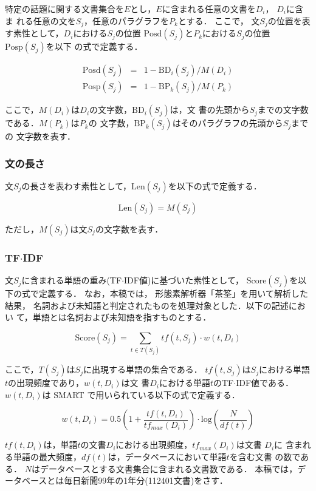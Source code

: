 特定の話題に関する文書集合を$E$とし，$E$に含まれる任意の文書を$D_i$，
$D_i$に含ま
れる任意の文を$S_j$，任意のパラグラフを$P_k$とする．
ここで，
文$S_j$の位置を表す素性として，$D_i$における$S_j$の位置
$\mbox{Posd}(S_j)$と$P_{k}$における$S_j$の位置$\mbox{Posp}(S_j)$を以下
の式で定義する．

\begin{eqnarray}
 \mbox{Posd}(S_j) &=& 1 - \mbox{BD}_i(S_j)/M(D_i) \nonumber\\
 \mbox{Posp}(S_{j}) &=& 1 - \mbox{BP}_{k}(S_j)/M(P_{k}) \nonumber
\end{eqnarray}

ここで，$M(D_i)$は$D_i$の文字数，$\mbox{BD}_i(S_j)$は，文
書の先頭から$S_j$までの文字数である．$M(P_{k})$は$P_{k}$の
文字数，$\mbox{BP}_{k}(S_j)$はそのパラグラフの先頭から$S_j$までの
文字数を表す．

\subsubsection*{文の長さ\cite{article27}}

文$S_j$の長さを表わす素性として，$\mbox{Len}(S_j)$を以下の式で定義する．

\[
 \mbox{Len}(S_j) = M(S_j)
\]

\noindent ただし，$M(S_j)$は文$S_j$の文字数を表す．

\subsubsection*{{\bf {\rm TF$\cdot$IDF}}\cite{article4}}

文$S_j$に含まれる単語の重み(TF$\cdot$IDF値)に基づいた素性として，
$\mbox{Score}(S_j)$を以下の式で定義する．
なお，本稿では，
形態素解析器「茶筌」\cite{chasen}を用いて解析した結果，
名詞および未知語と判定されたものを処理対象とした．以下の記述におい
て，単語とは名詞および未知語を指すものとする．

\[
 \mbox{Score}(S_j) = \sum_{t \in T(S_j)} tf(t,S_j) \cdot w(t,D_i)
\]

ここで，$T(S_j)$は$S_j$に出現する単語の集合である．
$tf(t,S_j)$は$S_j$における単語$t$の出現頻度であり，$w(t,D_i)$は文
書$D_i$における単語$t$のTF$\cdot$IDF値である．$w(t,D_i)$は 
SMART で用いられている以下の式で定義する．

\[
 w(t,D_i) = 0.5 \left(1+\frac{tf(t,D_i)}{tf_{max}(D_i)}\right) \cdot \mbox{log} \left( \frac{N}{df(t)} \right)
\]

$tf(t,D_i)$は，単語$t$の文書$D_i$における出現頻度，$tf_{max}(D_i)$は文書
$D_i$に
含まれる単語の最大頻度，$df(t)$は，データベースにおいて単語$t$を含む文書
の数である．
$N$はデータベースとする文書集合に含まれる文書数である．
本稿では，データベースとは毎日新聞99年の1年分(112401文書)をさす．

